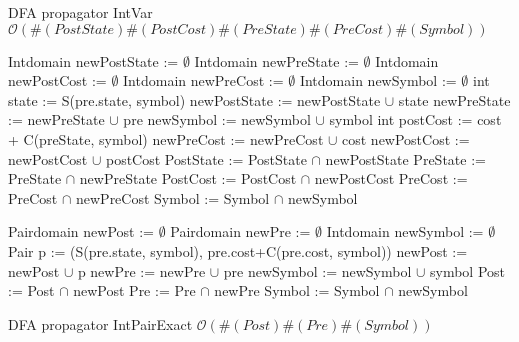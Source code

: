 \begin{algorithm}[H]
\caption{DFA propagator IntVar\newline $\mathcal{O}(\#(PostState)\#(PostCost)\#(PreState)\#(PreCost)\#(Symbol))$}
\begin{algorithmic}[1]
\State Intdomain newPostState := $\emptyset$
\State Intdomain newPreState := $\emptyset$
\State Intdomain newPostCost := $\emptyset$
\State Intdomain newPreCost := $\emptyset$
\State Intdomain newSymbol := $\emptyset$
		\State int state := S(pre.state, symbol)
			\State newPostState := newPostState $\cup$ state
			\State newPreState := newPreState $\cup$ pre
			\State newSymbol := newSymbol $\cup$ symbol 
				\State int postCost := cost + C(preState, symbol)
					\State newPreCost := newPreCost $\cup$ cost
					\State newPostCost := newPostCost $\cup$ postCost
				\EndIf
			\EndFor
		\EndIf
	\EndFor
\EndFor
\State PostState := PostState $\cap$ newPostState
\State PreState := PreState $\cap$ newPreState
\State PostCost := PostCost $\cap$ newPostCost
\State PreCost := PreCost $\cap$ newPreCost
\State Symbol := Symbol $\cap$ newSymbol
\EndProcedure
\end{algorithmic}
\end{algorithm} 

\begin{algorithm}[H]
\begin{algorithmic}[1]
\State Pairdomain newPost := $\emptyset$
\State Pairdomain newPre := $\emptyset$
\State Intdomain newSymbol := $\emptyset$
		\State Pair p := (S(pre.state, symbol), pre.cost+C(pre.cost, symbol))
			\State newPost := newPost $\cup$ p
			\State newPre := newPre $\cup$ pre
			\State newSymbol := newSymbol $\cup$ symbol 
		\EndIf
	\EndFor
\EndFor
\State Post := Post $\cap$ newPost
\State Pre := Pre $\cap$ newPre
\State Symbol := Symbol $\cap$ newSymbol
\EndProcedure
\end{algorithmic}
\caption{DFA propagator IntPairExact \newline $\mathcal{O}(\#(Post)\#(Pre)\#(Symbol))$}
\end{algorithm}


